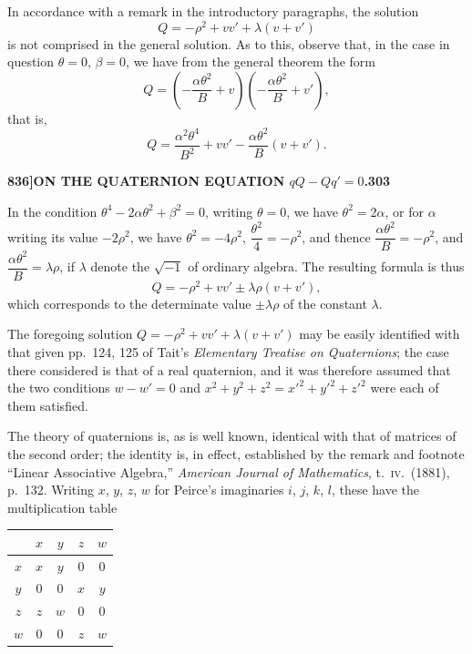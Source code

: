 \documentclass[11pt]{article}
\begin{document}
\medskip

In accordance with a remark in the introductory paragraphs, the solution
\[
Q = -\rho^{2} + vv' + \lambda(v + v')
\]
is not comprised in the general solution. As to this, observe that, in the case in question $\theta = 0$, $\beta = 0$, we have from the general theorem the form
\[
Q = \left(-\frac{\alpha\theta^{2}}{B} + v\right)\!\left(-\frac{\alpha\theta^{2}}{B} + v'\right),
\]
that is,
\[
Q = \frac{\alpha^{2}\theta^{4}}{B^{2}} + vv' - \frac{\alpha\theta^{2}}{B}(v + v').
\]

\newpage

\noindent\textbf{836]}\hfill\textbf{ON THE QUATERNION EQUATION $qQ - Qq' = 0$.}\hfill\textbf{303}

\bigskip

\noindent In the condition $\theta^{4} - 2\alpha\theta^{2} + \beta^{2} = 0$, writing $\theta = 0$, we have $\theta^{2} = 2\alpha$, or for $\alpha$ writing its value $-2\rho^{2}$, we have $\theta^{2} = -4\rho^{2}$, $\dfrac{\theta^{2}}{4} = -\rho^{2}$, and thence $\dfrac{\alpha\theta^{2}}{B} = -\rho^{2}$, and $\dfrac{\alpha\theta^{2}}{B} = \lambda\rho$, if $\lambda$ denote the $\sqrt{-1}$ of ordinary algebra. The resulting formula is thus
\[
Q = -\rho^{2} + vv' \pm \lambda\rho(v + v'),
\]
which corresponds to the determinate value $\pm\lambda\rho$ of the constant $\lambda$.

\medskip

The foregoing solution $Q = -\rho^{2} + vv' + \lambda(v + v')$ may be easily identified with that given pp.\ 124, 125 of Tait's \textit{Elementary Treatise on Quaternions}; the case there considered is that of a real quaternion, and it was therefore assumed that the two conditions $w - w' = 0$ and $x^{2} + y^{2} + z^{2} = x'^{2} + y'^{2} + z'^{2}$ were each of them satisfied.

\medskip

The theory of quaternions is, as is well known, identical with that of matrices of the second order; the identity is, in effect, established by the remark and footnote ``Linear Associative Algebra,'' \textit{American Journal of Mathematics}, t.\ \textsc{iv}.\ (1881), p.\ 132. Writing $x$, $y$, $z$, $w$ for Peirce's imaginaries $i$, $j$, $k$, $l$, these have the multiplication table

\medskip

\begin{center}
\begin{tabular}{c|cccc}
   & $x$ & $y$ & $z$ & $w$ \\ \hline
$x$ & $x$ & $y$ & $0$ & $0$ \\
$y$ & $0$ & $0$ & $x$ & $y$ \\
$z$ & $z$ & $w$ & $0$ & $0$ \\
$w$ & $0$ & $0$ & $z$ & $w$ \\
\end{tabular}
\end{center}
\end{document}
